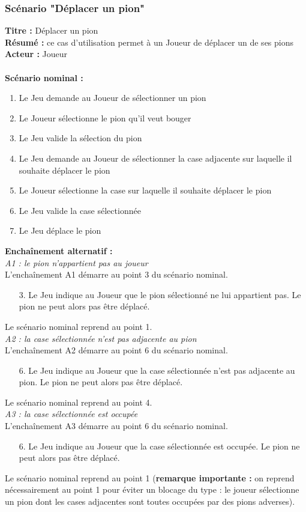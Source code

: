 \documentclass[12pt , a4paper]{article}
\begin{document}
\subsubsection{Scénario "Déplacer un pion"}
\noindent\textbf{Titre : } Déplacer un pion\\
\textbf{Résumé : } ce cas d'utilisation permet à un Joueur de déplacer un de ses pions\\
\textbf{Acteur : } Joueur\\ \\
\textbf{Scénario nominal :}
\begin{enumerate}
\item Le Jeu demande au Joueur de sélectionner un pion
\item Le Joueur sélectionne le pion qu'il veut bouger
\item Le Jeu valide la sélection du pion
\item Le Jeu demande au Joueur de sélectionner la case adjacente sur laquelle il souhaite déplacer le pion
\item Le Joueur sélectionne la case sur laquelle il souhaite déplacer le pion
\item Le Jeu valide la case sélectionnée
\item Le Jeu déplace le pion
\end{enumerate}
\textbf{Encha\^inement alternatif :}\\
\textit{A1 : le pion n'appartient pas au joueur}\\
L'encha\^inement A1 démarre au point 3 du scénario nominal.
\begin{enumerate}
\item[3.] Le Jeu indique au Joueur que le pion sélectionné ne lui appartient pas. Le pion ne peut alors pas \^etre déplacé.
\end{enumerate}
Le scénario nominal reprend au point 1.\\

\noindent\textit{A2 : la case sélectionnée n'est pas adjacente au pion}\\
L'encha\^inement A2 démarre au point 6 du scénario nominal.
\begin{enumerate}
\item[6.] Le Jeu indique au Joueur que la case sélectionnée n'est pas adjacente au pion. Le pion ne peut alors pas \^etre déplacé.
\end{enumerate}
Le scénario nominal reprend au point 4.\\

\noindent\textit{A3 : la case sélectionnée est occupée}\\
L'encha\^inement A3 démarre au point 6 du scénario nominal.
\begin{enumerate}
\item[6.] Le Jeu indique au Joueur que la case sélectionnée est occupée. Le pion ne peut alors pas \^etre déplacé.
\end{enumerate}
Le scénario nominal reprend au point  1 (\textbf{remarque importante : } on reprend nécessairement au point  1 pour éviter un blocage du type : le joueur sélectionne  un pion dont les cases adjacentes
sont toutes occupées par des pions adverses).
\end{document}
